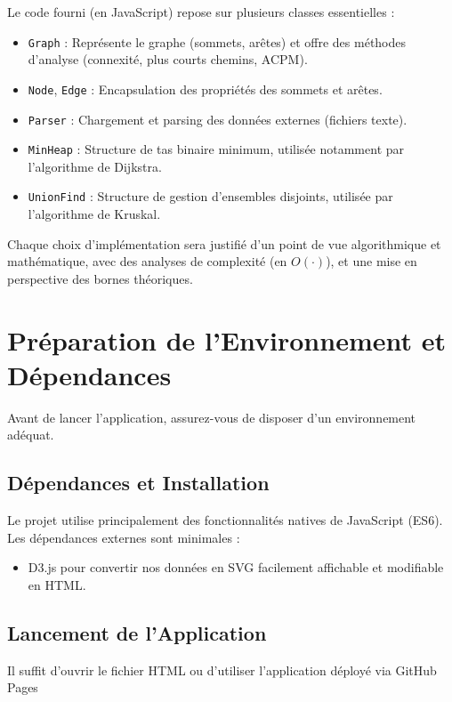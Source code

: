 \documentclass[a4paper,12pt]{article}
\begin{document}
Le code fourni (en JavaScript) repose sur plusieurs classes essentielles :
\begin{itemize}
    \item \texttt{Graph} : Représente le graphe (sommets, arêtes) et offre des méthodes d’analyse (connexité, plus courts chemins, ACPM).
    \item \texttt{Node}, \texttt{Edge} : Encapsulation des propriétés des sommets et arêtes.
    \item \texttt{Parser} : Chargement et parsing des données externes (fichiers texte).
    \item \texttt{MinHeap} : Structure de tas binaire minimum, utilisée notamment par l’algorithme de Dijkstra.
    \item \texttt{UnionFind} : Structure de gestion d'ensembles disjoints, utilisée par l’algorithme de Kruskal.
\end{itemize}

Chaque choix d’implémentation sera justifié d’un point de vue algorithmique et mathématique, avec des analyses de complexité (en $O(\cdot)$), et une mise en perspective des bornes théoriques.


\section{Préparation de l'Environnement et Dépendances}

Avant de lancer l’application, assurez-vous de disposer d’un environnement adéquat.

\subsection{Dépendances et Installation}

Le projet utilise principalement des fonctionnalités natives de JavaScript (ES6). Les dépendances externes sont minimales :

\begin{itemize}
    \item D3.js pour convertir nos données en SVG facilement affichable et modifiable en HTML.
\end{itemize}

\subsection{Lancement de l’Application}

Il suffit d'ouvrir le fichier HTML ou d'utiliser l'application déployé via GitHub Pages
\end{document}
